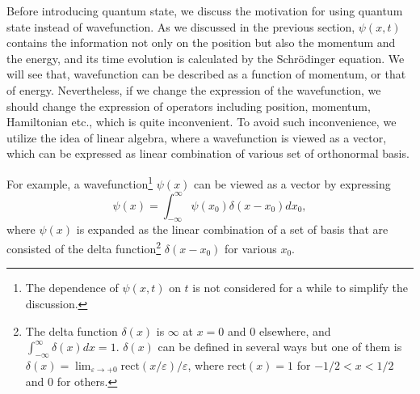 Before introducing quantum state, we discuss the motivation for using quantum state instead of wavefunction. As we discussed in the previous section, $\psi(x,t)$ contains the information not only on the position but also the momentum and the energy, and its time evolution is calculated by the Schr\"odinger equation. We will see that, wavefunction can be described as a function of momentum, or that of energy. Nevertheless, if we change the expression of the wavefunction, we should change the expression of operators including position, momentum, Hamiltonian etc., which is quite inconvenient. To avoid such inconvenience, we utilize the idea of linear algebra, where a wavefunction is viewed as a vector, which can be expressed as linear combination of various set of orthonormal basis.


For example, a wavefunction\footnote{The dependence of $\psi(x,t)$ on $t$ is not considered for a while to simplify the discussion.} $\psi(x)$ can be viewed as a vector by expressing
\begin{equation}
  \psi(x) = \int_{-\infty}^{\infty}\psi(x_0)\delta(x-x_0)dx_0,
  \label{eq:delta_function_1}
\end{equation}
where $\psi(x)$ is expanded as the linear combination of a set of basis that are consisted of the delta function\footnote{The delta function $\delta(x)$ is $\infty$ at $x = 0$ and $0$ elsewhere, and $\int_{-\infty}^{\infty}\delta(x)dx = 1$. $\delta(x)$ can be defined in several ways but one of them is $\delta(x) = \lim_{\varepsilon \to +0} \mathrm{rect}(x/\varepsilon)/\varepsilon$, where  $\mathrm{rect}(x) = 1$ for $-1/2 < x < 1/2$ and 0 for others.}
 $\delta(x-x_0)$ for various $x_0$. 

